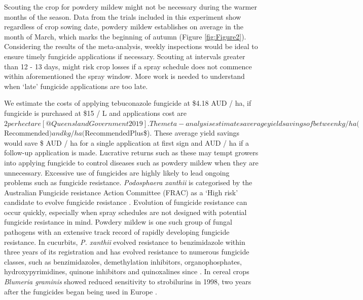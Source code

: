 \documentclass[agronomy,article,submit,moreauthors,pdftex]{mdpi}
\begin{document}
Scouting the crop for powdery mildew might not be necessary during the warmer months of the season.
Data from the trials included in this experiment show regardless of crop sowing date, powdery mildew establishes on average in the month of March, which marks the beginning of autumn (Figure \ref{fig:Figure2}).
Considering the results of the meta-analysis, weekly inspections would be ideal to ensure timely fungicide applications if necessary.
Scouting at intervals greater than 12 - 13 days, might risk crop losses if a spray schedule does not commence within aforementioned the spray window.
More work is needed to understand when `late' fungicide applications are too late.

We estimate the costs of applying tebuconazole fungicide at \$4.18 AUD / ha, if fungicide is purchased at \$15 / L \citep{Simfendorfer2011} and applications cost are \(2 per hectare [@QueenslandGovernment2019]. The meta-analysis estimates average yield savings of between kg / ha (\)Recommended\() and kg / ha (\)RecommendedPlus\$).
These average yield savings would save \$ AUD / ha for a single application at first sign and AUD / ha if a follow-up application is made.
Lucrative returns such as these may tempt growers into applying fungicide to control diseases such as powdery mildew when they are unnecessary.
Excessive use of fungicides are highly likely to lead ongoing problems such as fungicide resistance.
\emph{Podosphaera xanthii} is categorised by the Australian Fungicide resistance Action Committee (FRAC) as a `High risk' candidate to evolve fungicide resistance \citep{FRACrisk2019}.
Evolution of fungicide resistance can occur quickly, especially when spray schedules are not designed with potential fungicide resistance in mind.
Powdery mildew is one such group of fungal pathogens with an extensive track record of rapidly developing fungicide resistance.
In cucurbits, \emph{P. xanthii} evolved resistance to benzimidazole within three years of its registration \citep{Peterson1973} and has evolved resistance to numerous fungicide classes, such as benzimidazoles, demethylation inhibitors, organophosphates, hydroxypyrimidines, quinone inhibitors and quinoxalines since \citep{Mcgrath2001}.
In cereal crops \emph{Blumeria graminis} showed reduced sensitivity to strobilurins in 1998, two years after the fungicides began being used in Europe \citep{Chin2001}.
\end{document}

